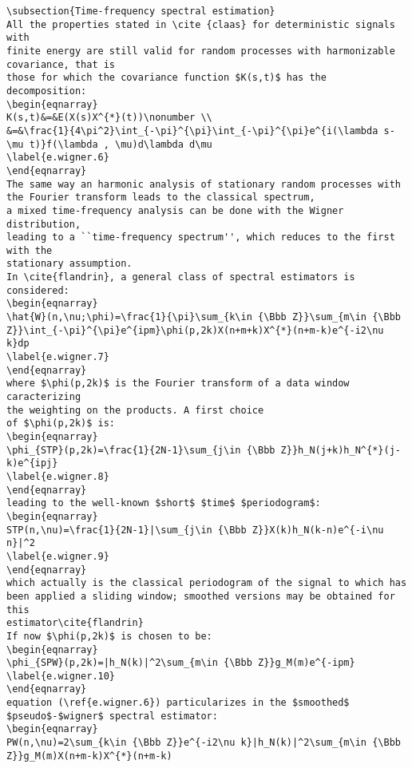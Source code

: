{\begin{verbatim}
\subsection{Time-frequency spectral estimation}
All the properties stated in \cite {claas} for deterministic signals with 
finite energy are still valid for random processes with harmonizable 
covariance, that is 
those for which the covariance function $K(s,t)$ has the decomposition: 
\begin{eqnarray}
K(s,t)&=&E(X(s)X^{*}(t))\nonumber \\
&=&\frac{1}{4\pi^2}\int_{-\pi}^{\pi}\int_{-\pi}^{\pi}e^{i(\lambda s-\mu t)}f(\lambda , \mu)d\lambda d\mu
\label{e.wigner.6}
\end{eqnarray}
The same way an harmonic analysis of stationary random processes with the Fourier transform leads to the classical spectrum, 
a mixed time-frequency analysis can be done with the Wigner distribution, 
leading to a ``time-frequency spectrum'', which reduces to the first with the 
stationary assumption.
In \cite{flandrin}, a general class of spectral estimators is considered: 
\begin{eqnarray}
\hat{W}(n,\nu;\phi)=\frac{1}{\pi}\sum_{k\in {\Bbb Z}}\sum_{m\in {\Bbb Z}}\int_{-\pi}^{\pi}e^{ipm}\phi(p,2k)X(n+m+k)X^{*}(n+m-k)e^{-i2\nu k}dp
\label{e.wigner.7}
\end{eqnarray}
where $\phi(p,2k)$ is the Fourier transform of a data window caracterizing 
the weighting on the products. A first choice
of $\phi(p,2k)$ is: 
\begin{eqnarray}
\phi_{STP}(p,2k)=\frac{1}{2N-1}\sum_{j\in {\Bbb Z}}h_N(j+k)h_N^{*}(j-k)e^{ipj}
\label{e.wigner.8}
\end{eqnarray}
leading to the well-known $short$ $time$ $periodogram$: 
\begin{eqnarray}
STP(n,\nu)=\frac{1}{2N-1}|\sum_{j\in {\Bbb Z}}X(k)h_N(k-n)e^{-i\nu n}|^2
\label{e.wigner.9}
\end{eqnarray}
which actually is the classical periodogram of the signal to which has 
been applied a sliding window; smoothed versions may be obtained for this 
estimator\cite{flandrin}
If now $\phi(p,2k)$ is chosen to be: 
\begin{eqnarray}
\phi_{SPW}(p,2k)=|h_N(k)|^2\sum_{m\in {\Bbb Z}}g_M(m)e^{-ipm}
\label{e.wigner.10}
\end{eqnarray}
equation (\ref{e.wigner.6}) particularizes in the $smoothed$ 
$pseudo$-$wigner$ spectral estimator: 
\begin{eqnarray}
PW(n,\nu)=2\sum_{k\in {\Bbb Z}}e^{-i2\nu k}|h_N(k)|^2\sum_{m\in {\Bbb Z}}g_M(m)X(n+m-k)X^{*}(n+m-k)

\end{verbatim}}
